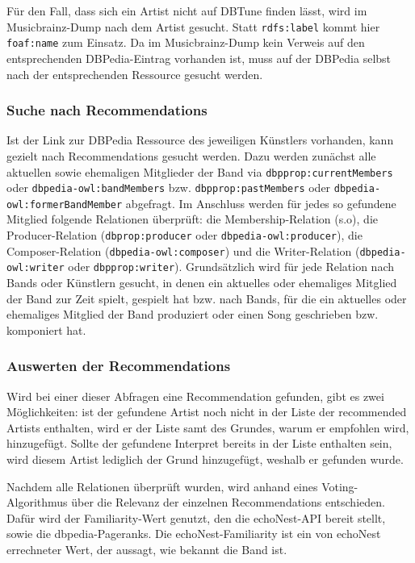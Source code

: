 Für den Fall, dass sich ein Artist nicht auf DBTune finden lässt, wird im Musicbrainz-Dump nach dem Artist gesucht. Statt \texttt{rdfs:label} kommt hier \texttt{foaf:name} zum Einsatz. Da im Musicbrainz-Dump kein Verweis auf den entsprechenden DBPedia-Eintrag vorhanden ist, muss auf der DBPedia selbst nach der entsprechenden Ressource gesucht werden.


\subsubsection{Suche nach Recommendations}
Ist der Link zur DBPedia Ressource des jeweiligen Künstlers vorhanden, kann gezielt nach Recommendations gesucht werden. Dazu werden zunächst alle aktuellen sowie ehemaligen Mitglieder der Band via \texttt{dbpprop:currentMembers} oder \texttt{dbpedia-owl:bandMembers}  bzw. \texttt{dbpprop:pastMembers} oder \texttt{dbpedia-owl:formerBandMember} abgefragt. Im Anschluss werden für jedes so gefundene Mitglied folgende Relationen überprüft: die Membership-Relation (s.o), die Producer-Relation (\texttt{dbprop:producer} oder \texttt{dbpedia-owl:producer}), die Composer-Relation (\texttt{dbpedia-owl:composer}) und die Writer-Relation (\texttt{dbpedia-owl:writer} oder \texttt{dbpprop:writer}). Grundsätzlich wird für jede Relation nach Bands oder Künstlern gesucht, in denen ein aktuelles oder ehemaliges Mitglied der Band zur Zeit spielt, gespielt hat bzw. nach Bands, für die ein aktuelles oder ehemaliges Mitglied der Band produziert oder einen Song geschrieben bzw. komponiert hat. 

\subsubsection{Auswerten der Recommendations}
Wird bei einer dieser Abfragen eine Recommendation gefunden, gibt es zwei Möglichkeiten: ist der gefundene Artist noch nicht in der Liste der recommended Artists enthalten, wird er der Liste samt des Grundes, warum er empfohlen wird, hinzugefügt. Sollte der gefundene Interpret bereits in der Liste enthalten sein, wird diesem Artist lediglich der Grund hinzugefügt, weshalb er gefunden wurde.  %

Nachdem alle Relationen überprüft wurden, wird anhand eines Voting-Algorithmus über die Relevanz der einzelnen Recommendations entschieden. Dafür wird der Familiarity-Wert genutzt, den die echoNest-API bereit stellt, sowie die dbpedia-Pageranks. Die echoNest-Familiarity ist ein von echoNest errechneter Wert, der aussagt, wie bekannt die Band ist. %


